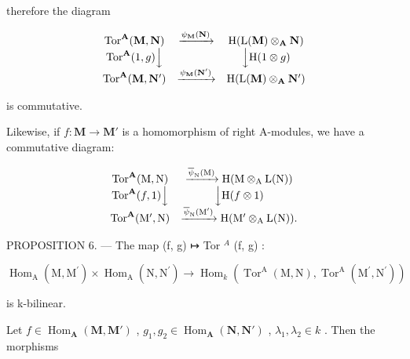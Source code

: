 therefore the diagram

\[
\begin{array}{c c c} \operatorname{Tor} ^ {\mathbf {A}} (\mathbf {M}, \mathbf {N}) & \xrightarrow {\psi_ {\mathbf {M}} (\mathbf {N})} & \mathrm{H} (\mathrm{L} (\mathbf {M}) \otimes_ {\mathbf {A}} \mathbf {N}) \\ \operatorname{Tor} ^ {\mathbf {A}} (1, g) \Big \downarrow & & \Big \downarrow \mathrm{H} (1 \otimes g) \\ \operatorname{Tor} ^ {\mathbf {A}} (\mathbf {M}, \mathbf {N} ^ {\prime}) & \xrightarrow {\psi_ {\mathbf {M}} (\mathbf {N} ^ {\prime})} & \mathrm{H} (\mathrm{L} (\mathbf {M}) \otimes_ {\mathbf {A}} \mathbf {N} ^ {\prime}) \end{array}
\]

is commutative.

Likewise, if \(f: \mathbf{M} \to \mathbf{M}'\) is a homomorphism of right A-modules, we have a commutative diagram:

\[
\begin{array}{c c} \operatorname{Tor} ^ {\mathbf {A}} (\mathrm{M}, \mathrm{N}) & \xrightarrow {\overline {{\psi}} _ {\mathrm{N}} (\mathrm{M})} \mathrm{H} (\mathrm{M} \otimes_ {\mathrm{A}} \mathrm{L} (\mathrm{N})) \\ \operatorname{Tor} ^ {\mathbf {A}} (f, 1) \Big \downarrow & \Big \downarrow \mathrm{H} (f \otimes 1) \\ \operatorname{Tor} ^ {\mathbf {A}} (\mathrm{M} ^ {\prime}, \mathrm{N}) & \xrightarrow {\overline {{\psi}} _ {\mathrm{N}} (\mathrm{M} ^ {\prime})} \mathrm{H} (\mathrm{M} ^ {\prime} \otimes_ {\mathrm{A}} \mathrm{L} (\mathrm{N})). \end{array}
\]

PROPOSITION 6. --- The map (f, g) ↦ Tor \(^{A}\) (f, g) :

\[
\operatorname{Hom} _ {\mathrm{A}} \left(\mathrm{M}, \mathrm{M} ^ {\prime}\right) \times \operatorname{Hom} _ {\mathrm{A}} \left(\mathrm{N}, \mathrm{N} ^ {\prime}\right)\rightarrow \operatorname{Hom} _ {k} \left(\operatorname{Tor} ^ {\mathrm{A}} (\mathrm{M}, \mathrm{N}), \operatorname{Tor} ^ {\mathrm{A}} \left(\mathrm{M} ^ {\prime}, \mathrm{N} ^ {\prime}\right)\right)
\]

is k-bilinear.

Let \(f \in \operatorname{Hom}_{\mathbf{A}}(\mathbf{M}, \mathbf{M}')\) , \(g_1, g_2 \in \operatorname{Hom}_{\mathbf{A}}(\mathbf{N}, \mathbf{N}')\) , \(\lambda_1, \lambda_2 \in k\) . Then the morphisms


